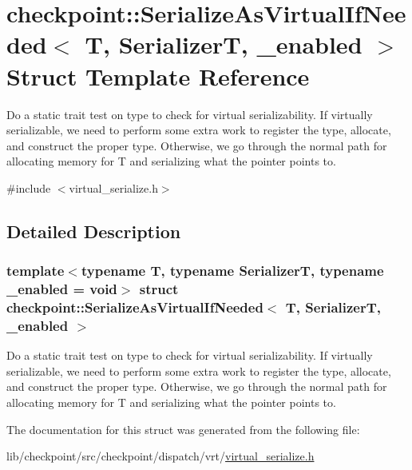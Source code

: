 \hypertarget{structcheckpoint_1_1_serialize_as_virtual_if_needed}{}\section{checkpoint\+:\+:Serialize\+As\+Virtual\+If\+Needed$<$ T, SerializerT, \+\_\+enabled $>$ Struct Template Reference}
\label{structcheckpoint_1_1_serialize_as_virtual_if_needed}


Do a static trait test on type to check for virtual serializability. If virtually serializable, we need to perform some extra work to register the type, allocate, and construct the proper type. Otherwise, we go through the normal path for allocating memory for T and serializing what the pointer points to.  




{\ttfamily \#include $<$virtual\+\_\+serialize.\+h$>$}



\subsection{Detailed Description}
\subsubsection*{template$<$typename T, typename SerializerT, typename \+\_\+enabled = void$>$\newline
struct checkpoint\+::\+Serialize\+As\+Virtual\+If\+Needed$<$ T, Serializer\+T, \+\_\+enabled $>$}

Do a static trait test on type to check for virtual serializability. If virtually serializable, we need to perform some extra work to register the type, allocate, and construct the proper type. Otherwise, we go through the normal path for allocating memory for T and serializing what the pointer points to. 

The documentation for this struct was generated from the following file\+:\begin{DoxyCompactItemize}
\item 
lib/checkpoint/src/checkpoint/dispatch/vrt/\hyperlink{virtual__serialize_8h}{virtual\+\_\+serialize.\+h}\end{DoxyCompactItemize}
